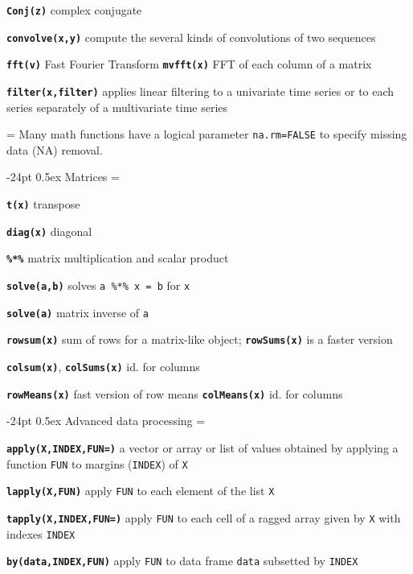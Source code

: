 \documentclass[8pt,landscape]{article}
\makeatletter
\renewcommand\section{\@startsection{section}{1}{0mm}%
                                     {-24pt}%
                                     {0.5ex}%
                                {\color{blue}\normalfont\large\bfseries}}
\newcommand{\code}{\texttt}
\newcommand{\bcode}[1]{\texttt{\textbf{#1}}}
\makeatother
\begin{document}
\begin{multicols*}{3}
\bcode{Conj(z)} complex conjugate

\bcode{convolve(x,y)} compute the several kinds of
     convolutions of two sequences

\bcode{fft(v)} Fast Fourier Transform
\bcode{mvfft(x)} FFT of each column of a matrix

\bcode{filter(x,filter)} applies linear filtering to a univariate time series or to each
     series separately of a multivariate time series

\everypar={\hangindent=0mm}
Many math functions have a logical parameter \code{na.rm=FALSE} to
specify missing data (NA) removal.




\section{Matrices}
\everypar={\hangindent=9mm}

\bcode{t(x)} transpose

\bcode{diag(x)} diagonal

\bcode{\%*\%} matrix multiplication and scalar product

\bcode{solve(a,b)} solves \code{a \%*\% x = b} for \code{x}

\bcode{solve(a)} matrix inverse of \code{a}

\bcode{rowsum(x)} sum of rows for a matrix-like object;
\bcode{rowSums(x)} is a faster version

\bcode{colsum(x)}, \bcode{colSums(x)} id. for columns

\bcode{rowMeans(x)} fast version of row means
\bcode{colMeans(x)} id. for columns


\section{Advanced data processing}
\everypar={\hangindent=9mm}

\bcode{apply(X,INDEX,FUN=)} a vector or array or list of values obtained by applying a
     function \code{FUN} to margins (\code{INDEX}) of \code{X}

\bcode{lapply(X,FUN)} apply \code{FUN} to each element of the list \code{X}

\bcode{tapply(X,INDEX,FUN=)} apply \code{FUN} to each cell
of a ragged array given by \code{X} with indexes \code{INDEX}

\bcode{by(data,INDEX,FUN)} apply \code{FUN} to data frame \code{data}
subsetted by \code{INDEX}


\end{multicols*}
\end{document}
